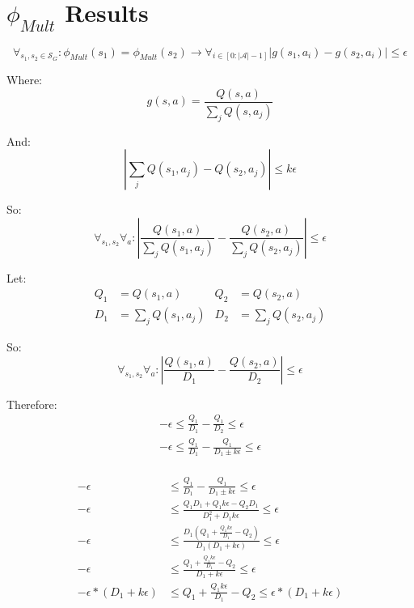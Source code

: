 \documentclass[11pt]{amsart}
\begin{document}
\section{$\phi_{Mult}$ Results}

\begin{equation}
\forall_{s_1, s_2 \in \mathcal{S}_G} : \phi_{Mult}(s_1) = \phi_{Mult}(s_2) \rightarrow \forall_{i \in [0:|\mathcal{A}| - 1]} | g(s_1, a_i) - g(s_2, a_i) | \leq \epsilon
\label{eq:phi_d}
\end{equation}

Where:
\begin{equation}
g(s,a) = \frac{Q(s,a)}{\sum_j Q(s,a_j)}
\end{equation}

And:
\begin{equation}
|\sum_j Q(s_1,a_j) - Q(s_2,a_j) | \leq k\epsilon
\end{equation}

So:
\begin{equation}
\forall_{s_1,s_2} \forall_a : | \frac{Q(s_1,a)}{\sum_j Q(s_1,a_j)} - \frac{Q(s_2,a)}{\sum_j Q(s_2,a_j)} | \leq \epsilon
\end{equation}

Let:
\begin{align}
Q_1 &= Q(s_1,a) &Q_2 &= Q(s_2,a) \\
D_1 &= \sum_j Q(s_1,a_j) &D_2 &= \sum_j Q(s_2,a_j) 
\end{align}

So:
\begin{equation}
\forall_{s_1,s_2} \forall_a : | \frac{Q(s_1,a)}{D_1} - \frac{Q(s_2,a)}{D_2} | \leq \epsilon
\end{equation}

Therefore:
\begin{align*}
-\epsilon \leq \frac{Q_1}{D_1} - \frac{Q_1}{D_2} \leq \epsilon \\
-\epsilon \leq \frac{Q_1}{D_1} - \frac{Q_1}{D_1 \pm k\epsilon} \leq \epsilon \\
\end{align*}

\encircle{+}
\begin{align*}
-\epsilon &\leq \frac{Q_1}{D_1} - \frac{Q_1}{D_1 \pm k\epsilon} \leq \epsilon \\
-\epsilon &\leq \frac{Q_1 D_1 + Q_1 k \epsilon - Q_2 D_1}{D_1^2 + D_1 k \epsilon} \leq \epsilon \\
-\epsilon &\leq \frac{D_1 (Q_1 + \frac{Q_1 k \epsilon}{D_1} - Q_2)}{D_1 (D_1 + k \epsilon)} \leq \epsilon \\
-\epsilon &\leq \frac{Q_1 + \frac{Q_1 k \epsilon}{D_1} - Q_2}{D_1 + k \epsilon} \leq \epsilon \\
-\epsilon*(D_1 + k \epsilon) &\leq Q_1 + \frac{Q_1 k \epsilon}{D_1} - Q_2 \leq \epsilon*(D_1 + k \epsilon) \\
\end{align*}
\end{document}
